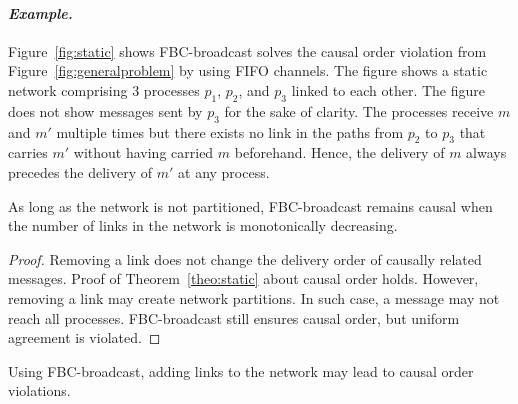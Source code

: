 \paragraph{\emph{Example.}} Figure~\ref{fig:static} shows FBC-broadcast solves
the causal order violation from Figure~\ref{fig:generalproblem} by using FIFO
channels.  The figure shows a static network comprising 3 processes $p_1$,
$p_2$, and $p_3$ linked to each other. The figure does not show messages sent by
$p_3$ for the sake of clarity.  The processes receive $m$ and $m'$ multiple
times but there exists no link in the paths from $p_2$ to $p_3$ that carries $m'$
without having carried $m$ beforehand. Hence, the delivery of $m$ always
precedes the delivery of $m'$ at any process.


\begin{theorem}
  As long as the network is not partitioned, FBC-broadcast remains causal when
  the number of links in the network is monotonically decreasing.
\end{theorem}

\begin{proof}
  Removing a link does not change the delivery order of causally related
  messages. Proof of Theorem~\ref{theo:static} about causal order holds.
  However, removing a link may create network partitions. In such case, a
  message may not reach all processes. FBC-broadcast still ensures causal order,
  but uniform agreement is violated.
\end{proof}

\begin{theorem}
  Using FBC-broadcast, adding links to the network may lead to causal order
  violations.
\end{theorem}

